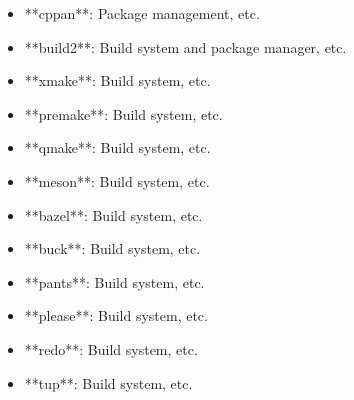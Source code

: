\documentclass[11pt,a4paper]{article}
\begin{document}
\begin{itemize}
\item **cppan**: Package management, etc.
\end{itemize}

\begin{itemize}
\item **build2**: Build system and package manager, etc.
\end{itemize}

\begin{itemize}
\item **xmake**: Build system, etc.
\end{itemize}

\begin{itemize}
\item **premake**: Build system, etc.
\end{itemize}

\begin{itemize}
\item **qmake**: Build system, etc.
\end{itemize}

\begin{itemize}
\item **meson**: Build system, etc.
\end{itemize}

\begin{itemize}
\item **bazel**: Build system, etc.
\end{itemize}

\begin{itemize}
\item **buck**: Build system, etc.
\end{itemize}

\begin{itemize}
\item **pants**: Build system, etc.
\end{itemize}

\begin{itemize}
\item **please**: Build system, etc.
\end{itemize}

\begin{itemize}
\item **redo**: Build system, etc.
\end{itemize}

\begin{itemize}
\item **tup**: Build system, etc.
\end{itemize}
\end{document}
